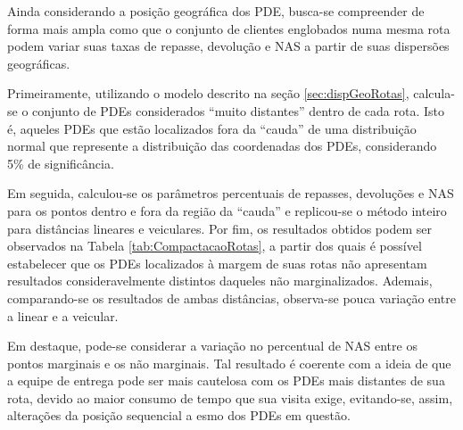 Ainda considerando a posição geográfica dos PDE, busca-se compreender de forma mais ampla como que o conjunto de clientes englobados numa mesma rota podem variar suas taxas de repasse, devolução e NAS a partir de suas dispersões geográficas.

Primeiramente, utilizando o modelo descrito na seção \ref{sec:dispGeoRotas}, calcula-se o conjunto de PDEs considerados ``muito distantes'' dentro de cada rota. 
Isto é, aqueles PDEs que estão localizados fora da ``cauda'' de uma distribuição normal que represente a distribuição das coordenadas dos PDEs, considerando 5\% de significância. 

Em seguida, calculou-se os parâmetros percentuais de repasses, devoluções e NAS para os pontos dentro e fora da região da ``cauda'' e replicou-se o método inteiro para distâncias lineares e veiculares. 
Por fim, os resultados obtidos podem ser observados na Tabela \ref{tab:CompactacaoRotas}, a partir dos quais é possível estabelecer que os PDEs localizados à margem de suas rotas não apresentam resultados consideravelmente distintos daqueles não marginalizados.
Ademais, comparando-se os resultados de ambas distâncias, observa-se pouca variação entre a linear e a veicular.

Em destaque, pode-se considerar a variação no percentual de NAS entre os pontos marginais e os não marginais.
Tal resultado é coerente com a ideia de que a equipe de entrega pode ser mais cautelosa com os PDEs mais distantes de sua rota, devido ao maior consumo de tempo que sua visita exige, evitando-se, assim, alterações da posição sequencial a esmo dos PDEs em questão.


